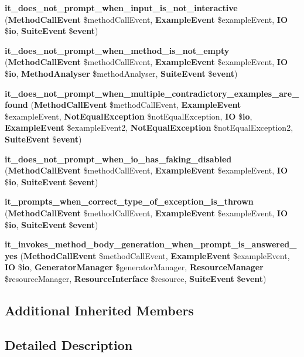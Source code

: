 \begin{DoxyCompactItemize}
\item 
{\bf it\+\_\+does\+\_\+not\+\_\+prompt\+\_\+when\+\_\+input\+\_\+is\+\_\+not\+\_\+interactive} ({\bf Method\+Call\+Event} \$method\+Call\+Event, {\bf Example\+Event} \$example\+Event, {\bf I\+O} \${\bf io}, {\bf Suite\+Event} \${\bf event})
\item 
{\bf it\+\_\+does\+\_\+not\+\_\+prompt\+\_\+when\+\_\+method\+\_\+is\+\_\+not\+\_\+empty} ({\bf Method\+Call\+Event} \$method\+Call\+Event, {\bf Example\+Event} \$example\+Event, {\bf I\+O} \${\bf io}, {\bf Method\+Analyser} \$method\+Analyser, {\bf Suite\+Event} \${\bf event})
\item 
{\bf it\+\_\+does\+\_\+not\+\_\+prompt\+\_\+when\+\_\+multiple\+\_\+contradictory\+\_\+examples\+\_\+are\+\_\+found} ({\bf Method\+Call\+Event} \$method\+Call\+Event, {\bf Example\+Event} \$example\+Event, {\bf Not\+Equal\+Exception} \$not\+Equal\+Exception, {\bf I\+O} \${\bf io}, {\bf Example\+Event} \$example\+Event2, {\bf Not\+Equal\+Exception} \$not\+Equal\+Exception2, {\bf Suite\+Event} \${\bf event})
\item 
{\bf it\+\_\+does\+\_\+not\+\_\+prompt\+\_\+when\+\_\+io\+\_\+has\+\_\+faking\+\_\+disabled} ({\bf Method\+Call\+Event} \$method\+Call\+Event, {\bf Example\+Event} \$example\+Event, {\bf I\+O} \${\bf io}, {\bf Suite\+Event} \${\bf event})
\item 
{\bf it\+\_\+prompts\+\_\+when\+\_\+correct\+\_\+type\+\_\+of\+\_\+exception\+\_\+is\+\_\+thrown} ({\bf Method\+Call\+Event} \$method\+Call\+Event, {\bf Example\+Event} \$example\+Event, {\bf I\+O} \${\bf io}, {\bf Suite\+Event} \${\bf event})
\item 
{\bf it\+\_\+invokes\+\_\+method\+\_\+body\+\_\+generation\+\_\+when\+\_\+prompt\+\_\+is\+\_\+answered\+\_\+yes} ({\bf Method\+Call\+Event} \$method\+Call\+Event, {\bf Example\+Event} \$example\+Event, {\bf I\+O} \${\bf io}, {\bf Generator\+Manager} \$generator\+Manager, {\bf Resource\+Manager} \$resource\+Manager, {\bf Resource\+Interface} \$resource, {\bf Suite\+Event} \${\bf event})
\end{DoxyCompactItemize}
\subsection*{Additional Inherited Members}


\subsection{Detailed Description}


